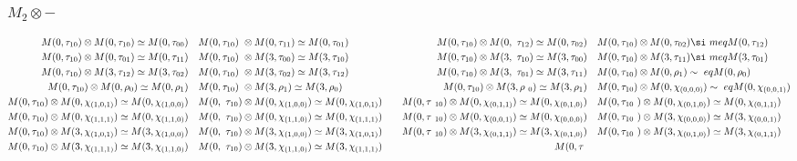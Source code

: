 \subsubsection{$M_2\otimes -$}
\begin{align*}
M(0,\tau_{10}) \otimes M(0,\tau_{10}) \simeq M(0,\tau_{00}) &&& M(0,\tau_{10})\
 \otimes M(0,\tau_{11}) \simeq M(0,\tau_{01}) &&& M(0,\tau_{10}) \otimes M(0,\
\tau_{12}) \simeq M(0,\tau_{02}) &&& M(0,\tau_{10}) \otimes M(0,\tau_{02}) \si\
meq M(0,\tau_{12})\\
M(0,\tau_{10}) \otimes M(0,\tau_{01}) \simeq M(0,\tau_{11}) &&& M(0,\tau_{10})\
 \otimes M(3,\tau_{00}) \simeq M(3,\tau_{10}) &&& M(0,\tau_{10}) \otimes M(3,\
\tau_{10}) \simeq M(3,\tau_{00}) &&& M(0,\tau_{10}) \otimes M(3,\tau_{11}) \si\
meq M(3,\tau_{01})\\
M(0,\tau_{10}) \otimes M(3,\tau_{12}) \simeq M(3,\tau_{02}) &&& M(0,\tau_{10})\
 \otimes M(3,\tau_{02}) \simeq M(3,\tau_{12}) &&& M(0,\tau_{10}) \otimes M(3,\
\tau_{01}) \simeq M(3,\tau_{11}) &&& M(0,\tau_{10}) \otimes M(0,\rho_{1}) \sim\
eq M(0,\rho_{0})\\
M(0,\tau_{10}) \otimes M(0,\rho_{0}) \simeq M(0,\rho_{1}) &&& M(0,\tau_{10}) \
\otimes M(3,\rho_{1}) \simeq M(3,\rho_{0}) &&& M(0,\tau_{10}) \otimes M(3,\rho\
_{0}) \simeq M(3,\rho_{1}) &&& M(0,\tau_{10}) \otimes M(0,\chi_{(0,0,0)}) \sim\
eq M(0,\chi_{(0,0,1)})\\
M(0,\tau_{10}) \otimes M(0,\chi_{(1,0,1)}) \simeq M(0,\chi_{(1,0,0)}) &&& M(0,\
\tau_{10}) \otimes M(0,\chi_{(1,0,0)}) \simeq M(0,\chi_{(1,0,1)}) &&& M(0,\tau\
_{10}) \otimes M(0,\chi_{(0,1,1)}) \simeq M(0,\chi_{(0,1,0)}) &&& M(0,\tau_{10\
}) \otimes M(0,\chi_{(0,1,0)}) \simeq M(0,\chi_{(0,1,1)})\\
M(0,\tau_{10}) \otimes M(0,\chi_{(1,1,1)}) \simeq M(0,\chi_{(1,1,0)}) &&& M(0,\
\tau_{10}) \otimes M(0,\chi_{(1,1,0)}) \simeq M(0,\chi_{(1,1,1)}) &&& M(0,\tau\
_{10}) \otimes M(0,\chi_{(0,0,1)}) \simeq M(0,\chi_{(0,0,0)}) &&& M(0,\tau_{10\
}) \otimes M(3,\chi_{(0,0,0)}) \simeq M(3,\chi_{(0,0,1)})\\
M(0,\tau_{10}) \otimes M(3,\chi_{(1,0,1)}) \simeq M(3,\chi_{(1,0,0)}) &&& M(0,\
\tau_{10}) \otimes M(3,\chi_{(1,0,0)}) \simeq M(3,\chi_{(1,0,1)}) &&& M(0,\tau\
_{10}) \otimes M(3,\chi_{(0,1,1)}) \simeq M(3,\chi_{(0,1,0)}) &&& M(0,\tau_{10\
}) \otimes M(3,\chi_{(0,1,0)}) \simeq M(3,\chi_{(0,1,1)})\\
M(0,\tau_{10}) \otimes M(3,\chi_{(1,1,1)}) \simeq M(3,\chi_{(1,1,0)}) &&& M(0,\
\tau_{10}) \otimes M(3,\chi_{(1,1,0)}) \simeq M(3,\chi_{(1,1,1)}) &&& M(0,\tau\

\end{align*}
